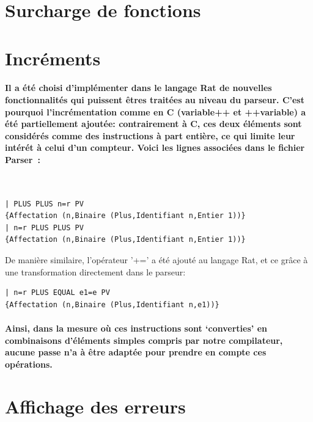 \documentclass[french]{article}
\begin{document}
\section{Surcharge de fonctions}

\section{Incréments}
\paragraph{Il a été choisi d'implémenter dans le langage Rat de nouvelles fonctionnalités qui puissent êtres traitées au niveau du parseur. C'est pourquoi
l'incrémentation comme en C (variable++ et ++variable) a été partiellement ajoutée: contrairement à C, ces deux éléments sont considérés comme
des instructions à part entière, ce qui limite leur intérét à celui d'un compteur. Voici les lignes associées dans le fichier Parser~:}
\,
\begin{lstlisting}
| PLUS PLUS n=r PV 
{Affectation (n,Binaire (Plus,Identifiant n,Entier 1))}
| n=r PLUS PLUS PV 
{Affectation (n,Binaire (Plus,Identifiant n,Entier 1))}
\end{lstlisting}
De manière similaire, l'opérateur '+=' a été ajouté au langage Rat, et ce grâce à une transformation directement dans le parseur:
\begin{lstlisting}
| n=r PLUS EQUAL e1=e PV 
{Affectation (n,Binaire (Plus,Identifiant n,e1))}
\end{lstlisting} 
\paragraph{Ainsi, dans la mesure où ces instructions sont `converties' en combinaisons d'éléments simples compris par notre compilateur, aucune passe n'a
à être adaptée pour prendre en compte ces opérations.}
\section{Affichage des erreurs}
\end{document}

